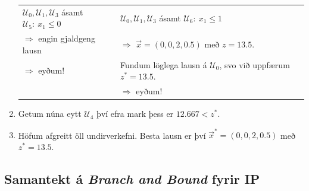 \begin{lausn}
\begin{enumerate}[label=(\arabic{*})]
    \begin{tabular}{p{6cm}|p{6cm}}
      $\mathcal{U}_0,\mathcal{U}_1,\mathcal{U}_3$ ásamt \mbox{$\mathcal{U}_5:~x_1\leq0$} &
      $\mathcal{U}_0,\mathcal{U}_1,\mathcal{U}_3$ ásamt \mbox{$\mathcal{U}_6:~x_1\leq1$} \\
      $\Rightarrow$ engin gjaldgeng lausn &
      $\Rightarrow$ $\vec{x}=(0,0,2,0.5)$ með $z=13.5$. \\
      $\Rightarrow$ eyðum! &
      Fundum löglega lausn á $\mathcal{U}_0$, svo við uppfærum $z^*=13.5$. \\
      & $\Rightarrow$ eyðum! 
    \end{tabular}

    \item
    Getum núna eytt $\mathcal{U}_4$ því efra mark þess er $12.667<z^*$.
  
    \item Höfum afgreitt öll undirverkefni. Besta lausn er því $\vec{x}^*=(0,0,2,0.5)$ með $z^*=13.5$. 
  \end{enumerate}

\end{lausn}






\subsection{Samantekt á \emph{Branch and Bound} fyrir IP}

